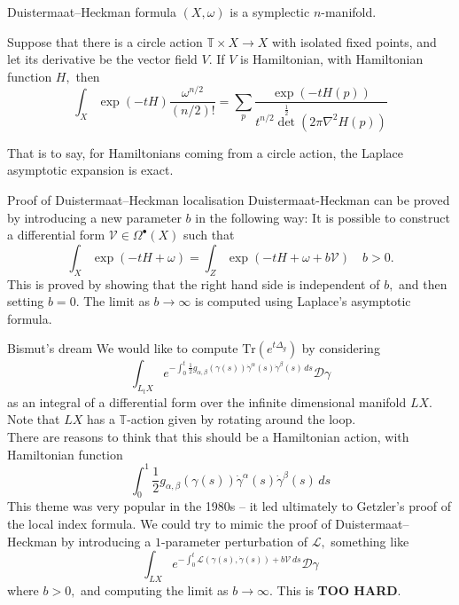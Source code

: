 \documentclass{beamer}
\numberwithin{equation}{section}
\theoremstyle{plain}
\theoremstyle{plain}
\theoremstyle{definition}
\theoremstyle{plain}
\theoremstyle{plain}
\theoremstyle{definition}
\newcommand{\Circ}{\mathbb{T}}
\newcommand{\Dc}{\mathcal{D}}
\newcommand{\Lc}{\mathcal{L}}
\newcommand{\Vc}{\mathcal{V}}
\newcommand{\Tr}{\mathrm{Tr}}
\begin{document}
\begin{frame}{Duistermaat--Heckman formula}
  $(X,\omega)$ is a symplectic $n$-manifold.
  \begin{theorem}
      Suppose that there is a circle action $\Circ\times X\to X$ with isolated fixed points, and let its derivative be the vector field $V.$ If $V$ is Hamiltonian, with Hamiltonian function $H,$ then
      \[
          \int_X \exp(-tH) \frac{\omega^{n/2}}{(n/2)!} = \sum_{p} \frac{\exp(-tH(p))}{t^{n/2}\det^{\frac12}(2\pi \nabla^2 H(p))}
      \]
  \end{theorem}
  \pause
  That is to say, for Hamiltonians coming from a circle action, the Laplace asymptotic expansion is exact.
\end{frame}

\begin{frame}{Proof of Duistermaat--Heckman localisation}
    Duistermaat-Heckman can be proved by introducing a new parameter $b$ in the following way: It is possible to construct a differential form $\Vc \in \Omega^{\bullet}(X)$ such that
    \[
      \int_X \exp(-tH+\omega) = \int_Z \exp(-tH+\omega+b\Vc)\quad b>0.
    \]
    This is proved by showing that the right hand side is independent of $b,$ and then setting $b=0.$ The limit as $b\to\infty$ is computed using Laplace's asymptotic formula.
\end{frame}

\begin{frame}{Bismut's dream}
  We would like to compute $\Tr(e^{t\Delta_g})$ by considering
  \[
    \int_{L_tX} e^{-\int_0^t \frac12 g_{\alpha,\beta}(\gamma(s))\dot{\gamma}^{\alpha}(s)\dot{\gamma}^\beta(s)\,ds} \Dc\gamma
  \]
  as an integral of a differential form over the infinite dimensional manifold $LX.$
  Note that $LX$ has a $\Circ$-action given by rotating around the loop.
  \\
  There are reasons to think that this should be a Hamiltonian action, with Hamiltonian function
  \[
  \int_0^1 \frac12 g_{\alpha,\beta}(\gamma(s))\dot{\gamma}^{\alpha}(s)\dot{\gamma}^\beta(s)\,ds
  \]
  \pause
  This theme was very popular in the 1980s -- it led ultimately to Getzler's proof of the local index formula.  
  \pause
  We could try to mimic the proof of Duistermaat--Heckman by introducing a $1$-parameter perturbation of $\Lc,$ something like
  \[
      \int_{LX} e^{-\int_0^t \Lc(\gamma(s),\dot{\gamma}(s))+b\Vc\,ds} \Dc\gamma
  \]
  where $b>0,$ and computing the limit as $b\to\infty.$
  \pause
  This is \textbf{TOO HARD}.
\end{frame}
\end{document}
